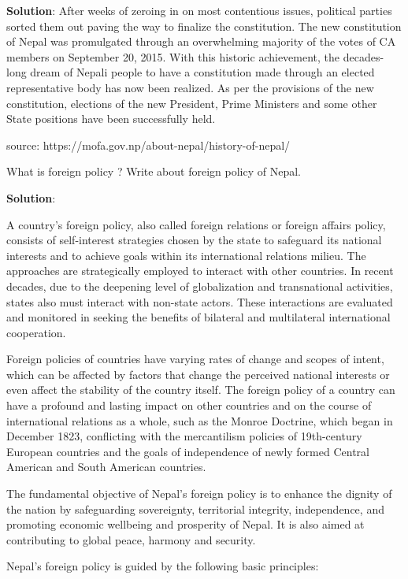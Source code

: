 \documentclass[
]{book}
\newcommand{\question}{\item}
\newenvironment{solution}{ {\bfseries Solution}:}{}
\begin{document}
\begin{questions}
\begin{solution}
After weeks of zeroing in on most contentious issues, political parties sorted them out paving the way to finalize the constitution. The new constitution of Nepal was promulgated through an overwhelming majority of the votes of CA members on September 20, 2015. With this historic achievement, the decades-long dream of Nepali people to have a constitution made through an elected representative body has now been realized. As per the provisions of the new constitution, elections of the new President, Prime Ministers and some other State positions have been successfully held.

source: https://mofa.gov.np/about-nepal/history-of-nepal/
\end{solution}

\question What is foreign policy ? Write about foreign policy of Nepal.

\begin{solution}

A country's foreign policy, also called foreign relations or foreign affairs policy, consists of self-interest strategies chosen by the state to safeguard its national interests and to achieve goals within its international relations milieu. The approaches are strategically employed to interact with other countries. In recent decades, due to the deepening level of globalization and transnational activities, states also must interact with non-state actors. These interactions are evaluated and monitored in seeking the benefits of bilateral and multilateral international cooperation. 

Foreign policies of countries have varying rates of change and scopes of intent, which can be affected by factors that change the perceived national interests or even affect the stability of the country itself. The foreign policy of a country can have a profound and lasting impact on other countries and on the course of international relations as a whole, such as the Monroe Doctrine, which began in December 1823, conflicting with the mercantilism policies of 19th-century European countries and the goals of independence of newly formed Central American and South American countries.

The fundamental objective of Nepal's foreign policy is to enhance the dignity of the nation by safeguarding sovereignty, territorial integrity, independence, and promoting economic wellbeing and prosperity of Nepal. It is also aimed at contributing to global peace, harmony and security.

Nepal's foreign policy is guided by the following basic principles:


\end{solution}
\end{questions}
\end{document}
